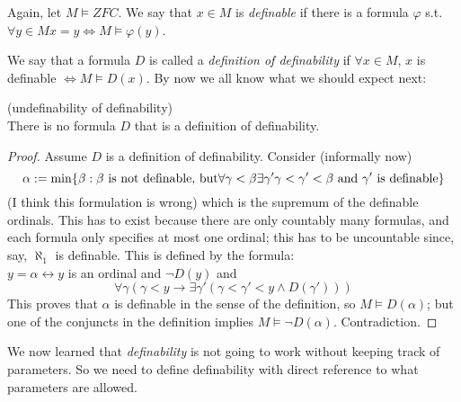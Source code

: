 \documentclass[a4paper]{article}
\begin{document}
Again, let $M \vDash ZFC$. We say that $x \in M$ is \emph{definable} if there is a formula $\varphi$ s.t. $\forall y \in M x=y \iff M \vDash \varphi(y)$.

We say that a formula $D$ is called a \emph{definition of definability} if $\forall x \in M$, $x$ is definable $\iff M \vDash D(x)$. By now we all know what we should expect next:

\begin{thm} (undefinability of definability)\\
There is no formula $D$ that is a definition of definability.
\begin{proof}
Assume $D$ is a definition of definability. Consider (informally now)
\[
\alpha := \min\{ \beta: \beta \text{ is not definable, but} \forall \gamma < \beta \exists \gamma' \gamma < \gamma' < \beta \text{ and } \gamma' \text{ is definable}\}\\
\]
(I think this formulation is wrong) which is the supremum of the definable ordinals. This has to exist because there are only countably many formulas, and each formula only specifies at most one ordinal; this has to be uncountable since, say, $\aleph_1$ is definable. This is defined by the formula:\\
$y = \alpha \leftrightarrow y$ is an ordinal and $\neg D(y)$ and
\[
\forall \gamma (\gamma < y \to \exists \gamma' (\gamma < \gamma' < y \wedge D(\gamma')))
\]
This proves that $\alpha$ is definable in the sense of the definition, so $M \vDash D(\alpha)$; but one of the conjuncts in the definition implies $M \vDash \neg D(\alpha)$. Contradiction.
\end{proof}
\end{thm}

We now learned that \emph{definability} is not going to work without keeping track of parameters. So we need to define definability with direct reference to what parameters are allowed.
\end{document}
